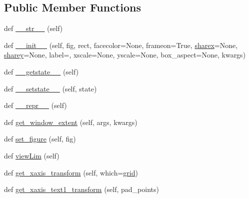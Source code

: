 \subsection*{Public Member Functions}
\begin{DoxyCompactItemize}
\item 
def \hyperlink{classmatplotlib_1_1axes_1_1__base_1_1__AxesBase_a8a596c6add6df2fb558608faedf5cf87}{\+\_\+\+\_\+str\+\_\+\+\_\+} (self)
\item 
def \hyperlink{classmatplotlib_1_1axes_1_1__base_1_1__AxesBase_a9d2feb01e59eaa3fa8f0f791a99f596c}{\+\_\+\+\_\+init\+\_\+\+\_\+} (self, fig, rect, facecolor=None, frameon=True, \hyperlink{classmatplotlib_1_1axes_1_1__base_1_1__AxesBase_ad21c01ca3c449dac1134cf4babc6997d}{sharex}=None, \hyperlink{classmatplotlib_1_1axes_1_1__base_1_1__AxesBase_adcd1add9e07535a57a121091b4b55f37}{sharey}=None, label=\textquotesingle{}\textquotesingle{}, xscale=None, yscale=None, box\+\_\+aspect=None, kwargs)
\item 
def \hyperlink{classmatplotlib_1_1axes_1_1__base_1_1__AxesBase_a65eebfbe872660fc594798db230d8f2e}{\+\_\+\+\_\+getstate\+\_\+\+\_\+} (self)
\item 
def \hyperlink{classmatplotlib_1_1axes_1_1__base_1_1__AxesBase_a5619cb715d534060d6ad84f19ee5ffb9}{\+\_\+\+\_\+setstate\+\_\+\+\_\+} (self, state)
\item 
def \hyperlink{classmatplotlib_1_1axes_1_1__base_1_1__AxesBase_a0070adf438042b802439efcdb621bcae}{\+\_\+\+\_\+repr\+\_\+\+\_\+} (self)
\item 
def \hyperlink{classmatplotlib_1_1axes_1_1__base_1_1__AxesBase_a16885d6b7a1b64a1bbee17f29630c8d7}{get\+\_\+window\+\_\+extent} (self, args, kwargs)
\item 
def \hyperlink{classmatplotlib_1_1axes_1_1__base_1_1__AxesBase_aa8e39d032ac51f668362d7574cdc7f68}{set\+\_\+figure} (self, fig)
\item 
def \hyperlink{classmatplotlib_1_1axes_1_1__base_1_1__AxesBase_a6ddd2eafdf4ae6db412e98959d0822cc}{view\+Lim} (self)
\item 
def \hyperlink{classmatplotlib_1_1axes_1_1__base_1_1__AxesBase_a4511508ae6322ff12881c7e6a9580243}{get\+\_\+xaxis\+\_\+transform} (self, which=\textquotesingle{}\hyperlink{classmatplotlib_1_1axes_1_1__base_1_1__AxesBase_aadaa6527c7642ea25841d7f7a12bc899}{grid}\textquotesingle{})
\item 
def \hyperlink{classmatplotlib_1_1axes_1_1__base_1_1__AxesBase_a8896d8871426ff604d109f5e4682716a}{get\+\_\+xaxis\+\_\+text1\+\_\+transform} (self, pad\+\_\+points)

\end{DoxyCompactItemize}

